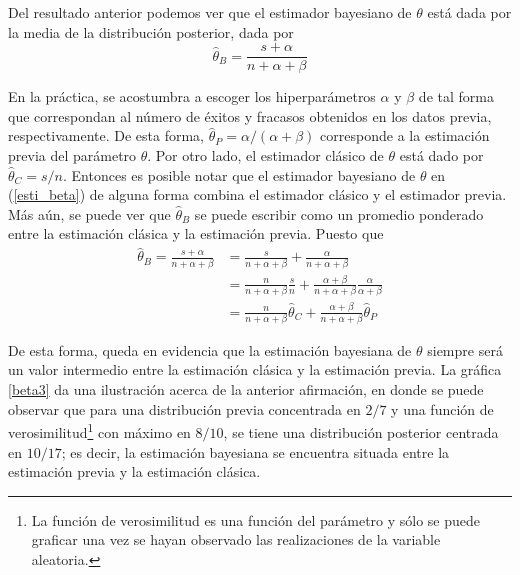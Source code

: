     Del resultado anterior podemos ver que el estimador bayesiano de $\theta$ est\'a dada por la media de la distribuci\'on posterior, dada por
    \begin{equation}\label{esti_beta}
    \hat{\theta}_{B}=\frac{s+\alpha}{n+\alpha+\beta}
    \end{equation}
    
    En la pr\'actica, se acostumbra a escoger los hiperpar\'ametros $\alpha$ y $\beta$ de tal forma que correspondan al n\'umero de \'exitos y fracasos obtenidos en los datos previa, respectivamente. De esta forma, $\hat{\theta}_{P}=\alpha/(\alpha+\beta)$ corresponde a la estimaci\'on previa del par\'ametro $\theta$. Por otro lado, el estimador cl\'asico de $\theta$ est\'a dado por $\hat{\theta}_{C}=s/n$. Entonces es posible notar que el estimador bayesiano de $\theta$ en (\ref{esti_beta}) de alguna forma combina el estimador cl\'asico y el estimador previa. M\'as a\'un, se puede ver que $\hat{\theta}_{B}$ se puede escribir como un promedio ponderado entre la estimaci\'on cl\'asica y la estimaci\'on previa. Puesto que
    \begin{align*}
    \hat{\theta}_{B}=\frac{s+\alpha}{n+\alpha+\beta}&=\frac{s}{n+\alpha+\beta}+\frac{\alpha}{n+\alpha+\beta}\\
    &=\frac{n}{n+\alpha+\beta}\frac{s}{n}+\frac{\alpha+\beta}{n+\alpha+\beta}\frac{\alpha}{\alpha+\beta}\\
    &=\frac{n}{n+\alpha+\beta}\hat{\theta}_{C}+\frac{\alpha+\beta}{n+\alpha+\beta}\hat{\theta}_{P}
    \end{align*}
    
    De esta forma, queda en evidencia que la estimaci\'on bayesiana de $\theta$ siempre ser\'a un valor intermedio entre la estimaci\'on cl\'asica y la estimaci\'on previa. La gr\'afica \ref{beta3} da una ilustraci\'on acerca de la anterior afirmaci\'on, en donde se puede observar que para una distribuci\'on previa concentrada en $2/7$ y una funci\'on de verosimilitud\footnote{La funci\'on de verosimilitud es una funci\'on del par\'ametro y s\'olo se puede graficar una vez se hayan observado las realizaciones de la variable aleatoria.} con m\'aximo en $8/10$, se tiene una distribuci\'on posterior centrada en $10/17$; es decir, la estimaci\'on bayesiana se encuentra situada entre la estimaci\'on previa y la estimaci\'on cl\'asica.
    
